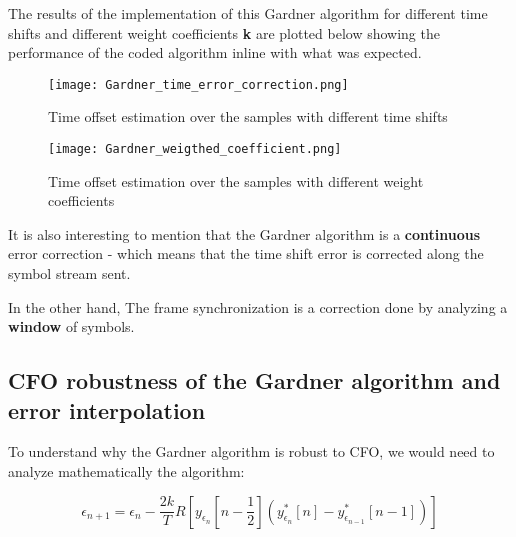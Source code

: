 The results of the implementation of this Gardner algorithm for different time shifts and different weight coefficients \textbf{k} are plotted below
showing the performance of the coded algorithm inline with what was expected.

\begin{figure}[H]
    \centering
    \texttt{[image: Gardner\_time\_error\_correction.png]}
    \caption{Time offset estimation over the samples with different time shifts}
    \label{fig:Gardner_time_error_correction}
\end{figure}

\begin{figure}[H]
    \centering
    \texttt{[image: Gardner\_weigthed\_coefficient.png]}
    \caption{Time offset estimation over the samples with different weight coefficients}
    \label{fig:Gardner_weigthed_coefficient}
\end{figure}

It is also interesting to mention that the Gardner algorithm is a \textbf{continuous} error correction - which means that
the time shift error is corrected along the symbol stream sent.\par
In the other hand, The frame synchronization is a correction done by analyzing a \textbf{window} of symbols.

\subsection{CFO robustness of the Gardner algorithm and error interpolation}

To understand why the Gardner algorithm is robust to CFO, we would need to analyze mathematically the algorithm:

\begin{equation*}
    \epsilon_{n+1} = \epsilon_{n} - \frac{2k}{T} R[y_{\epsilon_{n}}[n-\frac{1}{2}](y_{\epsilon_{n}}^{*}[n] - y_{\epsilon_{n-1}}^{*}[n-1])]
\end{equation*}

